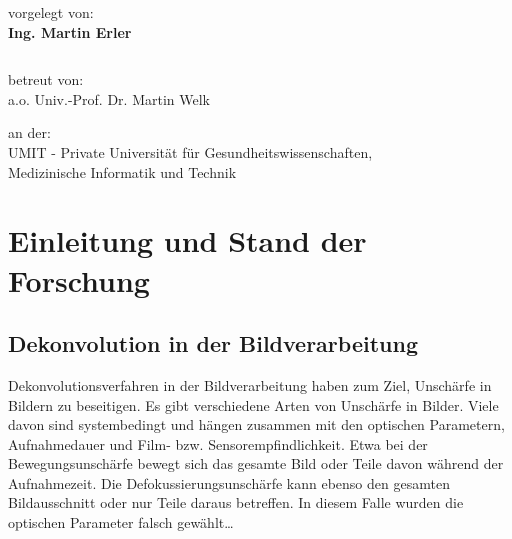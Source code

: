 \documentclass[a4paper,12pt]{article}
\begin{document}
\begin{verbatim}
\end{verbatim}



\begin{center}
vorgelegt von: \\
\textbf{\Large{Ing. Martin Erler}}
\end{center}


\begin{verbatim}
\end{verbatim}


\begin{center}
betreut von:\\
a.o. Univ.-Prof. Dr. Martin Welk
\end{center}

\begin{center}
an der:\\
UMIT - Private Universität für Gesundheitswissenschaften,\\
Medizinische Informatik und Technik
\end{center}



\newpage
\tableofcontents
\newpage

 


\section{Einleitung und Stand der Forschung}
\subsection{Dekonvolution in der Bildverarbeitung}

Dekonvolutionsverfahren in der Bildverarbeitung haben zum Ziel, Unschärfe in
Bildern zu beseitigen. Es gibt verschiedene Arten von Unschärfe in Bilder. Viele
davon sind systembedingt und hängen zusammen mit den optischen Parametern,
Aufnahmedauer und Film- bzw. Sensorempfindlichkeit.
Etwa bei der Bewegungsunschärfe bewegt sich das gesamte Bild oder
Teile davon während der Aufnahmezeit. Die Defokussierungsunschärfe kann ebenso den gesamten
Bildausschnitt oder nur Teile daraus betreffen. In diesem Falle wurden die
optischen Parameter falsch gewählt\ldots

\end{document}
